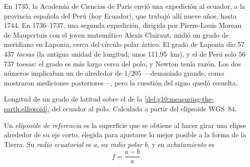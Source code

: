 \begin{history}
En 1735, la Academia de Ciencias de París envió una expedición al ecuador,
a la provincia española del Perú (hoy Ecuador), que trabajó allí nueve años,
hasta 1744. En 1736--1737, una segunda expedición, dirigida por Pierre-Louis
Moreau de Maupertuis con el joven matemático Alexis Clairaut, midió un grado
de meridiano en Laponia, cerca del círculo polar ártico. El grado de Laponia
dio 57\,437 \emph{toesas} (la antigua unidad de longitud; unos
\qty{111.95}{km}), y el de Perú solo 56\,737 toesas: el grado es más largo
cerca del polo, y Newton tenía razón. Los dos números implicaban un
 de alrededor de $1/205$ ---demasiado grande, como mostraron
mediciones posteriores---, pero la cuestión del signo quedó resuelta.
\end{history}

\begin{omfigure}

{\small Longitud de un grado de latitud sobre el  de
la \cref{def:g10:measuring-the-earth:ellipsoid}, del ecuador al polo.
Calculada a partir del elipsoide WGS~84.}
\end{omfigure}

\begin{definition}\label{def:g10:measuring-the-earth:ellipsoid}
Un \emph{elipsoide de referencia} es la
superficie que se obtiene al hacer girar una elipse alrededor de su eje
corto, elegida para ajustarse lo mejor posible a la forma de la Tierra. Su
\emph{radio ecuatorial} es $a$, su \emph{radio polar} $b$, y su
\emph{achatamiento} es
\[
  f = \frac{a-b}{a}.
\]
\end{definition}

